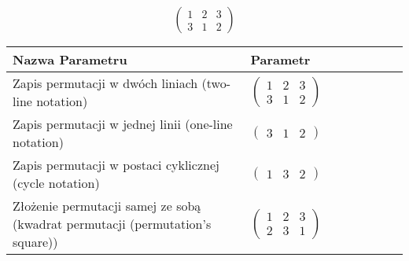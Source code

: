 \documentclass[12pt]{article}
\begin{document}
\subsection{}
\begin{center}
\[
\begin{pmatrix}
	1 & 2 & 3 \\ 
	3 & 1 & 2 
\end{pmatrix}
\]

\begin{tabular}{|m{0.6\linewidth}|m{0.4\linewidth}|}
	\hline
	Nazwa Parametru & Parametr \\
	\hline
	Zapis permutacji w dwóch liniach (two-line notation) & $\begin{pmatrix} 1 & 2 & 3 \\ 
3 & 1 & 2 \end{pmatrix}$ \\ 
	\hline
	Zapis permutacji w jednej linii (one-line notation) & $\begin{pmatrix} 3 & 1 & 2 \end{pmatrix}$ \\ 
	\hline
	Zapis permutacji w postaci cyklicznej (cycle notation) & $\begin{pmatrix} 1 & 3 & 2 \end{pmatrix} $ \\ 
	\hline
	Złożenie permutacji samej ze sobą (kwadrat permutacji (permutation's square)) & $\begin{pmatrix} 1 & 2 & 3 \\ 
2 & 3 & 1 \end{pmatrix}$ \\ 
	\hline
\end{tabular}
\end{center}
\end{document}
